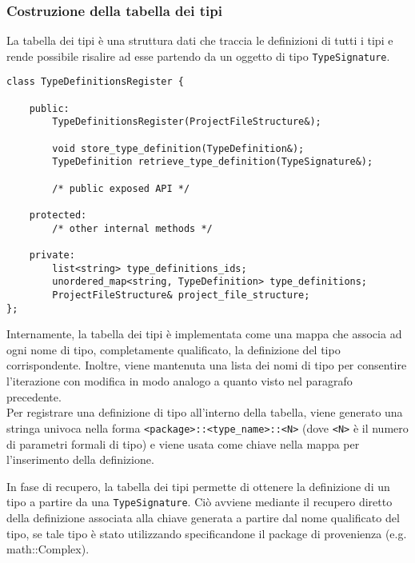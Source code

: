 \subsubsection{Costruzione della tabella dei tipi}
La tabella dei tipi è una struttura dati che traccia le definizioni di tutti i tipi
e rende possibile risalire ad esse partendo da un oggetto di tipo \texttt{TypeSignature}. \\

\vspace{0.5cm}
\begin{lstlisting}[frame=single]
class TypeDefinitionsRegister {

    public:
        TypeDefinitionsRegister(ProjectFileStructure&);

        void store_type_definition(TypeDefinition&);
        TypeDefinition retrieve_type_definition(TypeSignature&);

        /* public exposed API */

    protected:
        /* other internal methods */

    private:
        list<string> type_definitions_ids;
        unordered_map<string, TypeDefinition> type_definitions;
        ProjectFileStructure& project_file_structure;
};
\end{lstlisting}
\vspace{0.5cm}

Internamente, la tabella dei tipi è implementata come una mappa che associa ad ogni
nome di tipo, completamente qualificato, la definizione del tipo corrispondente. Inoltre, viene mantenuta una 
lista dei nomi di tipo per consentire l'iterazione con modifica in modo analogo a quanto visto nel paragrafo precedente. \\

Per registrare una definizione di tipo all'interno della tabella, viene generato una stringa 
univoca nella forma \texttt{<package>::<type\_name>::<N>} (dove \texttt{<N>} è il numero di parametri formali di tipo)
e viene usata come chiave nella mappa per l'inserimento della definizione.

In fase di recupero, la tabella dei tipi permette di ottenere la definizione di un tipo a partire da una \texttt{TypeSignature}.
Ciò avviene mediante il recupero diretto della definizione associata alla chiave generata a partire dal nome qualificato del tipo, 
se tale tipo è stato utilizzando specificandone il package di provenienza (e.g. math::Complex). \\

